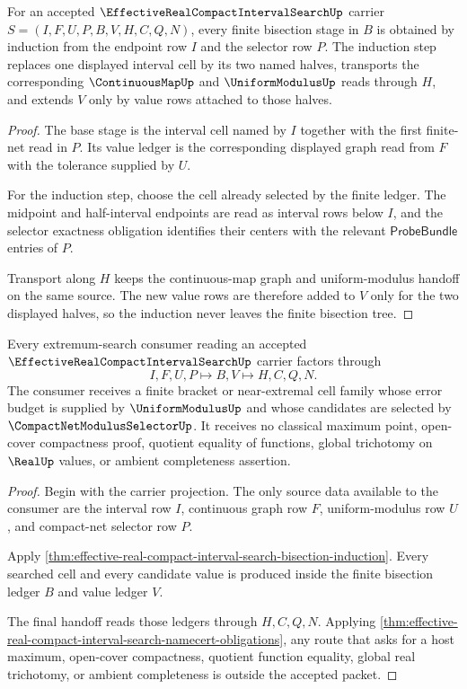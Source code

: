 \begin{theorem}
\label{thm:effective-real-compact-interval-search-bisection-induction}
For an accepted $\EffectiveRealCompactIntervalSearchUp$ carrier $S=(I,F,U,P,B,V,H,C,Q,N)$, every finite bisection stage in $B$ is obtained by induction from the endpoint row $I$ and the selector row $P$. The induction step replaces one displayed interval cell by its two named halves, transports the corresponding $\ContinuousMapUp$ and $\UniformModulusUp$ reads through $H$, and extends $V$ only by value rows attached to those halves.
\end{theorem}
\begin{proof}
The base stage is the interval cell named by $I$ together with the first finite-net read in $P$. Its value ledger is the corresponding displayed graph read from $F$ with the tolerance supplied by $U$.

For the induction step, choose the cell already selected by the finite ledger. The midpoint and half-interval endpoints are read as interval rows below $I$, and the selector exactness obligation identifies their centers with the relevant $\mathsf{ProbeBundle}$ entries of $P$.

Transport along $H$ keeps the continuous-map graph and uniform-modulus handoff on the same source. The new value rows are therefore added to $V$ only for the two displayed halves, so the induction never leaves the finite bisection tree.
\end{proof}

\begin{theorem}
\label{thm:effective-real-compact-interval-search-extreme-value-handoff}
Every extremum-search consumer reading an accepted $\EffectiveRealCompactIntervalSearchUp$ carrier factors through
$$
I,F,U,P \longmapsto B,V \longmapsto H,C,Q,N .
$$
The consumer receives a finite bracket or near-extremal cell family whose error budget is supplied by $\UniformModulusUp$ and whose candidates are selected by $\CompactNetModulusSelectorUp$. It receives no classical maximum point, open-cover compactness proof, quotient equality of functions, global trichotomy on $\RealUp$ values, or ambient completeness assertion.
\end{theorem}
\begin{proof}
Begin with the carrier projection. The only source data available to the consumer are the interval row $I$, continuous graph row $F$, uniform-modulus row $U$, and compact-net selector row $P$.

Apply \autoref{thm:effective-real-compact-interval-search-bisection-induction}. Every searched cell and every candidate value is produced inside the finite bisection ledger $B$ and value ledger $V$.

The final handoff reads those ledgers through $H,C,Q,N$. Applying \autoref{thm:effective-real-compact-interval-search-namecert-obligations}, any route that asks for a host maximum, open-cover compactness, quotient function equality, global real trichotomy, or ambient completeness is outside the accepted packet.
\end{proof}

